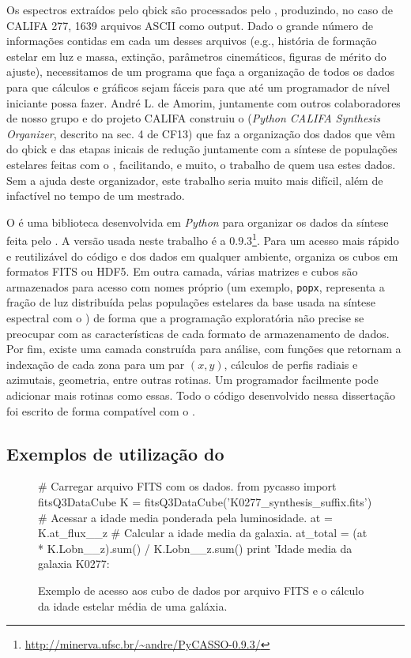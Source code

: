 Os espectros extraídos pelo {\sc qbick} são processados pelo \starlight, produzindo, no caso de CALIFA 277, 1639
arquivos ASCII como output. Dado o grande número de informações contidas em cada um desses arquivos (e.g., história de
formação estelar em luz e massa, extinção, parâmetros cinemáticos, figuras de mérito do ajuste), necessitamos de um
programa que faça a organização de todos os dados para que cálculos e gráficos sejam fáceis para que até um programador
de nível iniciante possa fazer. André L. de Amorim, juntamente com outros colaboradores de nosso grupo e do projeto
CALIFA construiu o \pycasso ({\em Python CALIFA \starlight Synthesis Organizer}, descrito na sec. 4 de CF13) que faz a
organização dos dados que vêm do {\sc qbick} e das etapas inicais de redução juntamente com a síntese de populações
estelares feitas com o \starlight, facilitando, e muito, o trabalho de quem usa estes dados. Sem a ajuda deste
organizador, este trabalho seria muito mais difícil, além de infactível no tempo de um mestrado.

O \pycasso é uma biblioteca desenvolvida em {\em Python} para organizar os dados da síntese feita pelo \starlight. A
versão usada neste trabalho é a $0.9.3$\footnote{\url{http://minerva.ufsc.br/~andre/PyCASSO-0.9.3/}}. Para um acesso mais
rápido e reutilizável do código e dos dados em qualquer ambiente, organiza os cubos em formatos FITS ou HDF5. Em outra
camada, várias matrizes e cubos são armazenados para acesso com nomes próprio (um exemplo, \texttt{popx}, representa a
fração de luz distribuída pelas populações estelares da base usada na síntese espectral com o \starlight) de forma que a
programação exploratória não precise se preocupar com as características de cada formato de armazenamento de dados. Por
fim, existe uma camada construída para análise, com funções que retornam a indexação de cada zona para um par $(x, y)$,
cálculos de perfis radiais e azimutais, geometria, entre outras rotinas. Um programador facilmente pode adicionar mais
rotinas como essas. Todo o código desenvolvido nessa dissertação foi escrito de forma compatível com o \pycasso.

\subsection{Exemplos de utilização do \pycasso}

\begin{figure}
	\begin{python}
# Carregar arquivo FITS com os dados.
from pycasso import fitsQ3DataCube
K = fitsQ3DataCube('K0277_synthesis_suffix.fits')
# Acessar a idade media ponderada pela luminosidade.
at = K.at_flux__z
# Calcular a idade media da galaxia.
at_total = (at * K.Lobn__z).sum() / K.Lobn__z.sum()
print 'Idade media da galaxia K0277: %
	\end{python}
	\caption[Exemplo de programa utilizando \pycasso.]
	{Exemplo de acesso aos cubo de dados por arquivo FITS e o cálculo da idade estelar média de uma galáxia.}
	\label{fig:dataAccess}
\end{figure}

